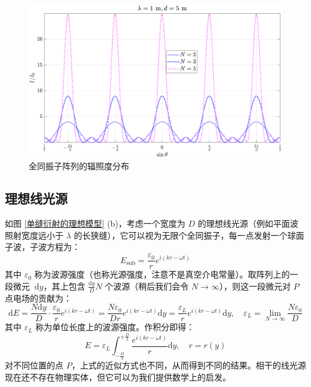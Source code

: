 \documentclass[UTF8]{report}
\theoremstyle{MyLineTheoremStyle} %
\theoremstyle{MyBlockTheoremStyle} %
\theoremstyle{MySubsubsectionStyle} %
\begin{document}
\begin{figure}[H]\centering
\includegraphics[width=0.95\columnwidth]{assets/4/4.2 全同振子.pdf}
\caption{全同振子阵列的辐照度分布}\label{全同振子阵列的辐照度分布}
\end{figure}

\subsection{理想线光源}

如图 \ref{单缝衍射的理想模型} (b)，考虑一个宽度为 $D$ 的理想线光源（例如平面波照射宽度远小于 $\lambda$ 的长狭缝），它可以视为无限个全同振子，每一点发射一个球面子波，子波方程为：
\begin{equation}
E_{\text{sub}} = \frac{\varepsilon_0}{r}e^{i(kr - \omega t)}
\end{equation}
其中 $\varepsilon_0$ 称为波源强度（也称光源强度，注意不是真空介电常量）。取阵列上的一段微元 $\ \mathrm{d}y$，其上包含 $\frac{\mathrm{d}y}{D}N$ 个波源（稍后我们会令 $N \to \infty$），则这一段微元对 $P$ 点电场的贡献为：
\begin{equation}
\mathrm{d}E = \frac{N\mathrm{d}y}{D}\cdot \frac{\varepsilon_0}{r}e^{i(kr - \omega t)} = \frac{N\varepsilon_0}{Dr}e^{i(kr - \omega t)} \mathrm{d}y = \frac{\varepsilon_L}{r}e^{i(kr - \omega t)} \mathrm{d}y,\quad \varepsilon_L = \lim_{N\to \infty} \frac{N\varepsilon_0}{D}
\end{equation}
其中 $\varepsilon_L$ 称为单位长度上的波源强度。作积分即得：
\begin{equation}\label{理想线光源积分公式}
E = \varepsilon_L \int_{-\frac{D}{2}}^{+\frac{D}{2}} \frac{e^{i(kr - \omega t)}}{r} \mathrm{d}y,\quad r = r(y)
\end{equation}
对不同位置的点 $P$，上式的近似方式也不同，从而得到不同的结果。相干的线光源现在还不存在物理实体，但它可以为我们提供数学上的启发。
\end{document}
